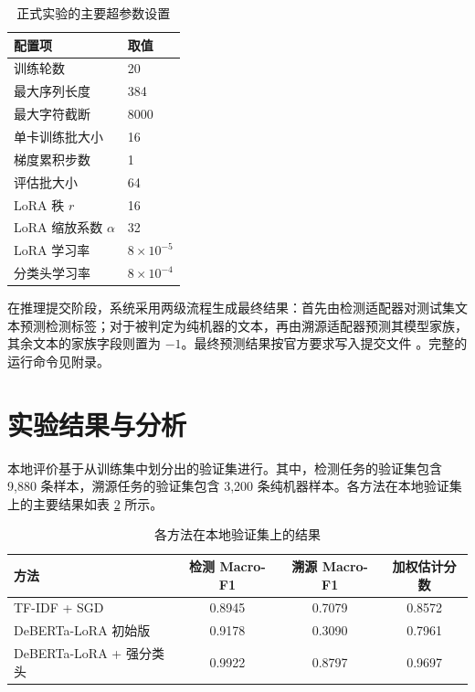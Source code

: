 \documentclass[UTF8,11pt,a4paper]{ctexart}
\begin{document}
\begin{table}[H]
  \centering
  \begin{tabular}{ll}
    \toprule
    配置项 & 取值 \\
    \midrule
    训练轮数 & 20 \\
    最大序列长度 & 384 \\
    最大字符截断 & 8000 \\
    单卡训练批大小 & 16 \\
    梯度累积步数 & 1 \\
    评估批大小 & 64 \\
    LoRA 秩 $r$ & 16 \\
    LoRA 缩放系数 $\alpha$ & 32 \\
    LoRA 学习率 & $8\times10^{-5}$ \\
    分类头学习率 & $8\times10^{-4}$ \\
    \bottomrule
  \end{tabular}
  \caption{正式实验的主要超参数设置}
  \label{tab:hyper}
\end{table}

在推理提交阶段，系统采用两级流程生成最终结果：首先由检测适配器对测试集文本预测检测标签；对于被判定为纯机器的文本，再由溯源适配器预测其模型家族，其余文本的家族字段则置为 $-1$。最终预测结果按官方要求写入提交文件 。完整的运行命令见附录。

\section{实验结果与分析}

本地评价基于从训练集中划分出的验证集进行。其中，检测任务的验证集包含 9,880 条样本，溯源任务的验证集包含 3,200 条纯机器样本。各方法在本地验证集上的主要结果如表 \ref{tab:results} 所示。

\begin{table}[H]
  \centering
  \begin{tabular}{lccc}
    \toprule
    方法 & 检测 Macro-F1 & 溯源 Macro-F1 & 加权估计分数 \\
    \midrule
    TF-IDF + SGD & 0.8945 & 0.7079 & 0.8572 \\
    DeBERTa-LoRA 初始版 & 0.9178 & 0.3090 & 0.7961 \\
    DeBERTa-LoRA + 强分类头 & 0.9922 & 0.8797 & 0.9697 \\
    \bottomrule
  \end{tabular}
  \caption{各方法在本地验证集上的结果}
  \label{tab:results}
\end{table}
\end{document}

